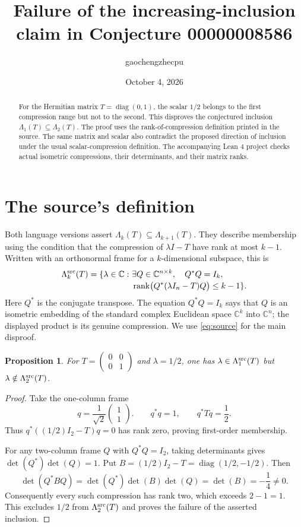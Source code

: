 \documentclass[11pt]{article}
\title{Failure of the increasing-inclusion claim in Conjecture 00000008586}
\author{gaochengzhecpu}
\date{October 4, 2026}
\newtheorem{proposition}{Proposition}
\begin{document}
\maketitle
\begin{abstract}
For the Hermitian matrix $T=\operatorname{diag}(0,1)$, the scalar $1/2$
belongs to the first compression range but not to the second. This
disproves the conjectured inclusion $\Lambda_1(T)\subseteq\Lambda_2(T)$.
The proof uses the rank-of-compression definition printed in the source.
The same matrix and scalar also contradict the proposed direction of
inclusion under the usual scalar-compression definition. The accompanying
Lean 4 project checks actual isometric compressions, their determinants,
and their matrix ranks.
\end{abstract}

\section{The source's definition}
Both language versions assert $\Lambda_k(T)\subseteq\Lambda_{k+1}(T)$.
They describe membership using the condition that the compression of
$\lambda I-T$ have rank at most $k-1$. Written with an orthonormal frame
for a $k$-dimensional subspace, this is
\begin{equation}\label{eq:source}
\begin{split}
\Lambda^{\rm src}_k(T)=\{\lambda\in\mathbb C:\ &\exists Q\in\mathbb C^{n\times k},\quad Q^*Q=I_k,\\[-2pt]
&\operatorname{rank}\bigl(Q^*(\lambda I_n-T)Q\bigr)\leq k-1\}.
\end{split}
\end{equation}
Here $Q^*$ is the conjugate transpose. The equation $Q^*Q=I_k$ says that
$Q$ is an isometric embedding of the standard complex Euclidean space
$\mathbb C^k$ into $\mathbb C^n$; the displayed product is its genuine
compression. We use \eqref{eq:source} for the main disproof.

\begin{proposition}
For $T=\left(\begin{smallmatrix}0&0\\0&1\end{smallmatrix}\right)$ and
$\lambda=1/2$, one has
$\lambda\in\Lambda^{\rm src}_1(T)$ but
$\lambda\notin\Lambda^{\rm src}_2(T)$.
\end{proposition}
\begin{proof}
Take the one-column frame
\[
 q=\frac1{\sqrt2}\begin{pmatrix}1\\1\end{pmatrix}.
 \qquad q^*q=1,\qquad q^*Tq=\frac12.
\]
Thus $q^*((1/2)I_2-T)q=0$ has rank zero, proving first-order membership.

For any two-column frame $Q$ with $Q^*Q=I_2$, taking determinants gives
$\det(Q^*)\det(Q)=1$. Put $B=(1/2)I_2-T=\operatorname{diag}(1/2,-1/2)$.
Then
\[
 \det(Q^*BQ)=\det(Q^*)\det(B)\det(Q)
            =\det(B)=-\frac14\ne0.
\]
Consequently every such compression has rank two, which exceeds
$2-1=1$. This excludes $1/2$ from $\Lambda^{\rm src}_2(T)$ and proves
the failure of the asserted inclusion.
\end{proof}
\end{document}
